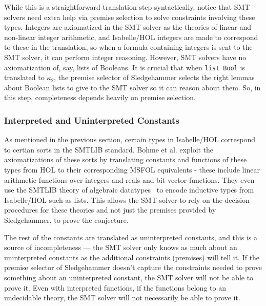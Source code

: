 \documentclass[11pt]{article}
\begin{document}
	While this is a straightforward
	translation step syntactically, 
	notice that SMT solvers need 
	extra help via premise selection 
	to solve constraints involving 
	these types. Integers are 
	axiomatized in the SMT solver as 
	the theories of linear and 
	non-linear integer arithmetic, and 
	Isabelle/HOL integers are made to 
	correspond to these in the translation, 
	so when a formula containing 
	integers is sent to the SMT solver, 
	it can perform integer reasoning. 
	However, SMT solvers have no 
	axiomatization of, say, lists 
	of Booleans. It is crucial that when 
	\texttt{list Bool} is 
	translated to $\kappa_2$, the 
	premise selector of Sledgehammer
	selects the right lemmas about 
	Boolean lists to give to the 
	SMT solver so it can reason 
	about them. So, in this step, 
	completeness depends heavily on 
	premise selection.
	
	\subsubsection{Interpreted and Uninterpreted Constants}
	As mentioned in the previous section,
	certain types in Isabelle/HOL correspond
	to certian sorts in the SMTLIB standard.
	Bohme et al. exploit the axiomatizations 
	of these sorts by translating constants 
	and functions of these types from HOL to 
	their corresponding MSFOL equivalents - these 
	include linear arithmetic functions over 
	integers and reals and bit-vector 
	functions. They even use the SMTLIB 
	theory of algebraic 
	datatypes~\cite{BarST-PDPAR-06} to 
	encode inductive types from Isabelle/HOL
	such as lists. This allows the SMT solver
	to rely on the decision procedures for 
	these theories and not just the premises
	provided by Sledgehammer, to prove the 
	conjecture. 
	
	The rest of the constants are 
	translated as uninterpreted constants, 
	and this is a source of 
	incompleteness --- the SMT solver only 
	knows as much about an uninterpreted 
	constants as the additional constraints 
	(premises) will tell it. If the premise 
	selector of Sledgehammer doesn't capture 
	the constraints needed to prove something
	about an uninterpreted constant, the SMT 
	solver will not be able to prove it.
	Even with interpreted functions, if the 
	functions belong to an undecidable theory,
	the SMT solver will not necessarily be 
	able to prove it.
	
\end{document}
